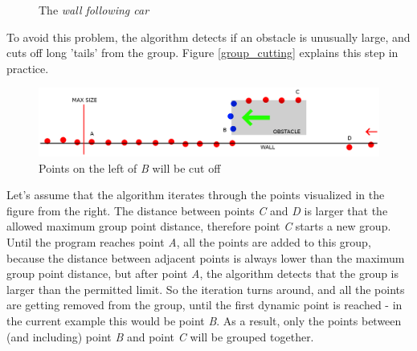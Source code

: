 \begin{figure}[!ht]
    \centering
    \caption{The \textit{wall following car}}
    \label{wall_following_car}
\end{figure}

To avoid this problem, the algorithm detects if an obstacle is unusually large, and cuts off long 'tails' from the group. Figure \autoref{group_cutting} explains this step in practice.

\begin{figure}[!ht]
    \centering
    \includegraphics[width=\textwidth]{figures/raw/group_cutting.png}
    \caption{Points on the left of \textit{B} will be cut off}
    \label{group_cutting}
\end{figure}

Let's assume that the algorithm iterates through the points visualized in the figure from the right. The distance between points \textit{C} and \textit{D} is larger that the allowed maximum group point distance, therefore point \textit{C} starts a new group. Until the program reaches point \textit{A}, all the points are added to this group, because the distance between adjacent points is always lower than the maximum group point distance, but after point \textit{A}, the algorithm detects that the group is larger than the permitted limit. So the iteration turns around, and all the points are getting removed from the group, until the first dynamic point is reached - in the current example this would be point \textit{B}. As a result, only the points between (and including) point \textit{B} and point \textit{C} will be grouped together.

